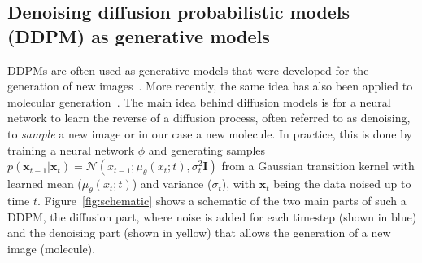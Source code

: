 \documentclass[journal=jacsat,manuscript=article]{achemso}
\begin{document}
\subsection*{Denoising diffusion probabilistic models (DDPM) as generative models}
DDPMs are often used as generative models that were developed for the generation of new images~\cite{sohl-dickstein2015deep, ho2020denoising, nichol2021improved}. More recently, the same idea has also been applied to molecular generation~\cite{hoogeboom2022equivariant}. The main idea behind diffusion models is for a neural network to learn the reverse of a diffusion process, often referred to as denoising, to \textit{sample} a new image or in our case a new molecule. In practice, this is done by training a neural network $\phi$ and generating samples $p(\mathbf{x}_{t-1}|\mathbf{x}_t)=\mathcal{N}(x_{t-1}; \mu_{\theta}(x_t;t), \sigma_t^2\mathbf{I})$ from  a Gaussian transition kernel with learned mean ($\mu_{\theta}(x_t;t)$) and variance ($\sigma_t$), with $\mathbf{x}_t$ being the data noised up to time $t$. Figure~\ref{fig:schematic} shows a schematic of the two main parts of such a DDPM, the diffusion part, where noise is added for each timestep (shown in blue) and the denoising part (shown in yellow) that allows the generation of a new image (molecule).
\end{document}
